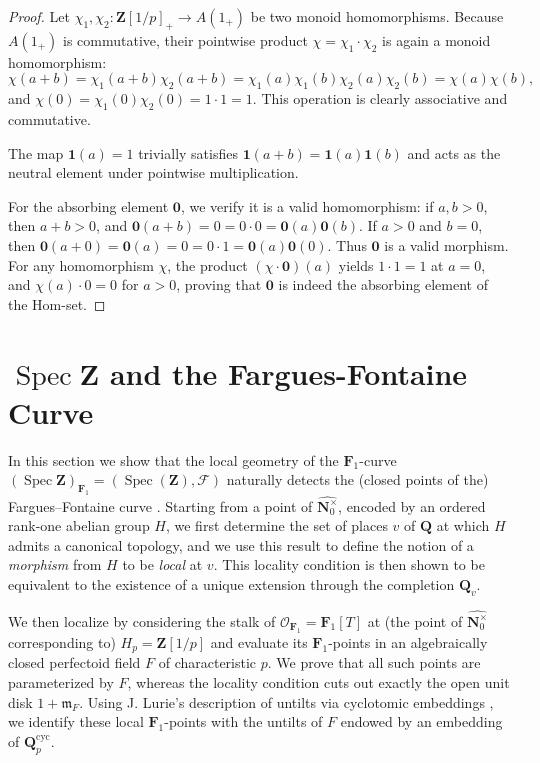 \documentclass[11pt,a4paper]{article}
\newcommand{\N}{\mathbf{N}}
\newcommand{\Q}{\mathbf{Q}}
\newcommand{\Z}{\mathbf{Z}}
\newcommand{\Fone}{\mathbf{F}_{1}}
\def\spzf{(\Spec \Z)_{\mathbf{F}_{1}}}
\newcommand{\nato}{\widehat{\N^\times_0}}
\newcommand{\Spec}{\operatorname{Spec}}
\begin{document}
\begin{proof}
Let $\chi_1, \chi_2 : \Z[1/p]_+ \to A(1_+)$ be two monoid homomorphisms. Because $A(1_+)$ is commutative, their pointwise product $\chi = \chi_1 \cdot \chi_2$ is again a monoid homomorphism:
\[
\chi(a+b) = \chi_1(a+b)\chi_2(a+b) = \chi_1(a)\chi_1(b)\chi_2(a)\chi_2(b) = \chi(a)\chi(b),
\]
and $\chi(0) = \chi_1(0)\chi_2(0) = 1 \cdot 1 = 1$. This operation is clearly associative and commutative. 

The map $\mathbf{1}(a) = 1$ trivially satisfies $\mathbf{1}(a+b) = \mathbf{1}(a)\mathbf{1}(b)$ and acts as the neutral element under pointwise multiplication. 

For the absorbing element $\mathbf{0}$, we verify it is a valid homomorphism: if $a, b > 0$, then $a+b > 0$, and $\mathbf{0}(a+b) = 0 = 0 \cdot 0 = \mathbf{0}(a)\mathbf{0}(b)$. If $a > 0$ and $b = 0$, then $\mathbf{0}(a+0) = \mathbf{0}(a) = 0 = 0 \cdot 1 = \mathbf{0}(a)\mathbf{0}(0)$. Thus $\mathbf{0}$ is a valid morphism. For any homomorphism $\chi$, the product $(\chi \cdot \mathbf{0})(a)$ yields $1 \cdot 1 = 1$ at $a=0$, and $\chi(a) \cdot 0 = 0$ for $a > 0$, proving that $\mathbf{0}$ is indeed the absorbing element of the Hom-set.
\end{proof}


\section{$\Spec\Z$ and the Fargues-Fontaine Curve}



In this section we show that the local geometry of the $\Fone$-curve $\spzf=(\Spec(\Z), \mathcal{F})$  naturally detects the (closed points of the) Fargues--Fontaine curve \cite{FF}. Starting from a point of  $\nato$, encoded by an ordered rank-one abelian group $H$, we first determine the set of places $v$ of $\Q$ at which $H$ admits a canonical topology, and we use this result to define the notion of a \emph{morphism} from $H$ to be \emph{local} at  $v$. This locality condition is then shown to be equivalent to the existence of a unique extension through the completion $\Q_v$.

We then localize by considering the stalk of $\mathcal{O}_{\Fone}=\Fone[T]$ at (the point of $\nato$ corresponding to) $H_p=\Z[1/p]$ and evaluate its $\Fone$-points in an algebraically closed perfectoid field $F$ of characteristic $p$. We prove that all such points are parameterized by $F$, whereas the locality condition cuts out exactly the open unit disk $1+\mathfrak m_F$. Using J. Lurie's description of untilts via cyclotomic embeddings \cite{Lurie}, we identify these local $\Fone$-points with the untilts of $F$ endowed by an embedding of $\Q_p^{\mathrm{cyc}}$.
\end{document}
